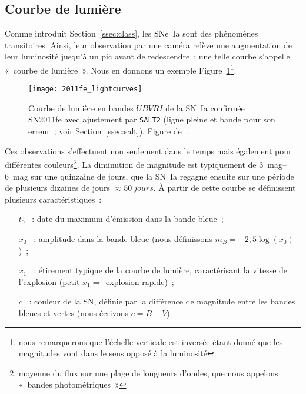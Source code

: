 \documentclass[../main/main.tex]{subfiles}
\begin{document}
\subsection{Courbe de lumière}\label{ssec:lc}

Comme introduit Section~\ref{ssec:class}, les SNe~Ia sont des phénomènes
transitoires. Ainsi, leur observation par une caméra relève une augmentation de
leur luminosité jusqu'à un pic avant de redescendre~: une telle courbe s'appelle
«~courbe de lumière~». Nous en donnons un exemple
Figure~\ref{fig:2011fe_phot}\footnote{nous remarquerons que l'échelle verticale
    est inversée étant donné que les magnitudes vont dans le sens opposé à la
luminosité}.

\begin{figure}[]
    \centering
    \texttt{[image: 2011fe\_lightcurves]}
    \caption[Courbe de lumière de la SN~Ia SN2011fe]{Courbe de lumière en bandes
        $UBVRI$ de la SN~Ia confirmée SN2011fe avec ajustement par
        \texttt{SALT2} (ligne pleine et bande pour son erreur~;
        voir Section~\ref{ssec:salt}). Figure
    de~\cite{pereira2013}.}\label{fig:2011fe_phot}
\end{figure}

Ces observations s'effectuent non seulement dans le temps mais également pour
différentes couleurs\footnote{moyenne du flux sur une plage de longueurs
d'ondes, que nous appelons «~bandes photométriques~»}. La diminution de magnitude
est typiquement de \SIrange{3}{6}{mag} sur une quinzaine de jours, que la SN~Ia
regagne ensuite sur une période de plusieurs dizaines de jours $\approx
\SI{50}{jours}$. À partir de cette courbe se définissent plusieurs
caractéristiques~:

\begin{itemize}
    \item[$t_0$]~: date du maximum d'émission dans la bande bleue~;
    \item[$x_0$]~: amplitude dans la bande bleue (nous définissons $m_B =
        -2,5\log(x_0)$)~;
    \item[$x_1$]~: étirement typique de la courbe de lumière, caractérisant la
        vitesse de l'explosion (petit $x_1 \Rightarrow$ explosion rapide)~;
    \item[$c$]~: couleur de la SN, définie par la différence de magnitude entre
        les bandes bleues et vertes (nous écrivons $c = B - V$).
\end{itemize}
\end{document}
